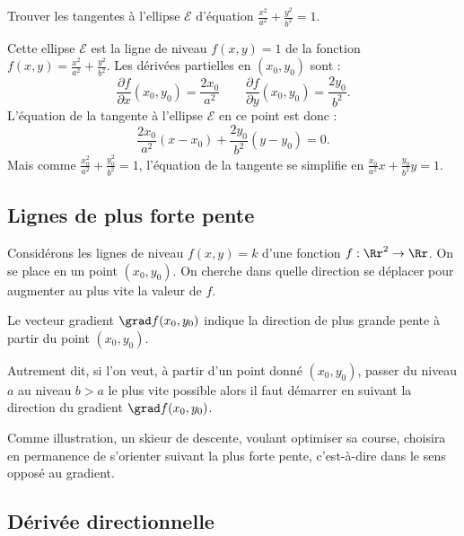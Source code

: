 \documentclass[11pt,class=report,crop=false]{standalone}
\begin{document}
\begin{exemple}
Trouver les tangentes à l'ellipse $\mathcal{E}$ d'équation $\frac{x^2}{a^2}+\frac{y^2}{b^2} = 1$.


Cette ellipse $\mathcal{E}$ est la ligne de niveau $f(x,y)=1$ de la fonction
$f(x,y) = \frac{x^2}{a^2}+\frac{y^2}{b^2}$. 
Les dérivées partielles en $(x_0, y_0)$ sont :
$$\frac{\partial f}{\partial x}(x_0,y_0) = \frac{2x_0}{a^2} \qquad \frac{\partial f}{\partial y}(x_0,y_0) = \frac{2y_0}{b^2}.$$
L'équation de la tangente à l'ellipse $\mathcal{E}$ en ce point est donc :
$$\frac{2x_0}{a^2}(x-x_0)+\frac{2y_0}{b^2}(y-y_0)=0.$$
Mais comme $\frac{x_0^2}{a^2}+\frac{y_0^2}{b^2} = 1$, l'équation de la tangente se simplifie en $\displaystyle \frac{x_0}{a^2}x + \frac{y_0}{b^2} y = 1$.
\end{exemple}


\subsection{Lignes de plus forte pente}
 
Considérons les lignes de niveau $f(x,y)=k$ d'une fonction $f : \Rr^2 \to \Rr$.
On se place en un point $(x_0,y_0)$. On cherche dans quelle direction se déplacer pour augmenter au plus vite la valeur de $f$.
 
\begin{proposition}
Le vecteur gradient $\grad f(x_0,y_0)$ indique la direction de plus grande pente à partir du point $(x_0,y_0)$.
\end{proposition}


Autrement dit, si l'on veut, à partir d'un point donné $(x_0,y_0)$, passer du niveau $a$ au niveau $b>a$ le plus vite possible alors il faut démarrer en suivant la direction du gradient $\grad f(x_0,y_0)$. 


Comme illustration, un skieur de descente, voulant optimiser sa course, choisira en permanence de s'orienter suivant la plus forte pente, c'est-à-dire dans le sens opposé au gradient. 
 
\subsection{Dérivée directionnelle}
 
\end{document}
